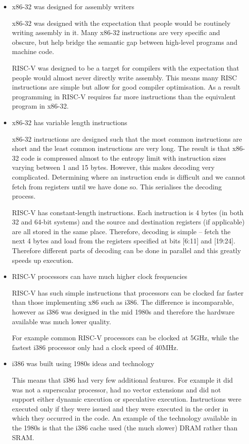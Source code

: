 \documentclass[10pt,\jkfside,a4paper]{article}
\begin{document}
\begin{enumerate}
\begin{itemize}
\item x86-32 was designed for assembly writers

x86-32 was designed with the expectation that people would be routinely
writing assembly in it. Many x86-32 instructions are very specific and
obscure, but help bridge the semantic gap between high-level programs and
machine code.

RISC-V was designed to be a target for compilers with the expectation that
people would almost never directly write assembly. This means many RISC
instructions are simple but allow for good compiler optimisation. As a
result programming in RISC-V requires far more instructions than the
equivalent program in x86-32.

\item x86-32 has variable length instructions

x86-32 instructions are designed such that the most common instructions are
short and the least common instructions are very long. The result is that
x86-32 code is compressed almost to the entropy limit with instruction sizes
varying between 1 and 15 bytes. However, this makes decoding very
complicated. Determining where an instruction ends is difficult and we
cannot fetch from registers until we have done so. This serialises the
decoding process.

RISC-V has constant-length instructions. Each instruction is 4 bytes (in
both 32 and 64-bit systems) and the source and destination registers (if
applicable) are all stored in the same place. Therefore, decoding is simple
-- fetch the next 4 bytes and load from the registers specified at bits
[6:11] and [19:24]. Therefore different parts of decoding can be done in
parallel and this greatly speeds up execution.

\item RISC-V processors can have much higher clock frequencies

RISC-V has such simple instructions that processors can be clocked far
faster than those implementing x86 such as i386. The difference is
incomparable, however as i386 was designed in the mid 1980s and therefore
the hardware available was much lower quality.

For example common RISC-V processors can be clocked at 5GHz, while the
fastest i386 processor only had a clock speed of 40MHz.

\item i386 was built using 1980s ideas and technology

This means that i386 had very few additional features. For example it did
was not a superscalar processor, had no vector extensions and did not support
either dynamic execution or speculative execution. Instructions were
executed only if they were issued and they were executed in the order in
which they occurred in the code. An example of the technology available in
the 1980s is that the i386 cache used (the much slower) DRAM rather than SRAM.


\end{itemize}
\end{enumerate}
\end{document}
